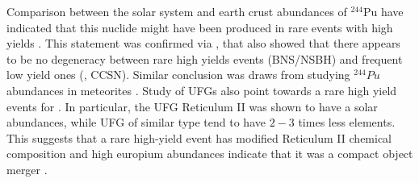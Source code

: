 %
%
Comparison between the solar system and earth crust abundances of $^{244}$Pu have indicated that this 
nuclide might have been produced in rare events with high yields \citep{Wallner:2015}. This statement 
was confirmed via , that also showed that there 
appears to be no degeneracy between rare high yields events (\ac{BNS}/\ac{NSBH}) 
and frequent low yield ones (\ie, \ac{CCSN}). Similar conclusion was draws from studying $^{244}Pu$ 
abundances in meteorites \citep{Tsujimoto:2017}.
%
Study of \acp{UFG} also point towards a rare high yield events for \rproc{} \nuc{}. In particular, 
the \ac{UFG} Reticulum II was shown to have a solar \rproc{} abundances, while \ac{UFG} of similar 
type tend to have $2-3$ times less \rproc{} elements. This suggests that a rare high-yield event 
has modified Reticulum II chemical composition and high europium abundances indicate that it was a 
compact object merger \citep{Ji:2016}. 
%

